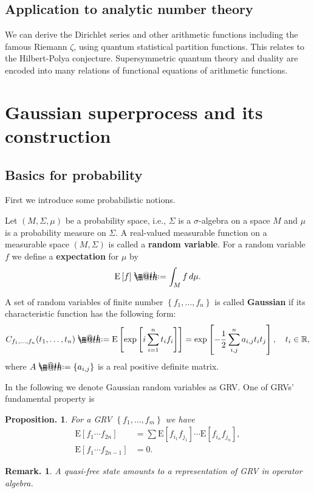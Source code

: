 \documentclass[openany, a4paper, oneside]{book}
\makeatletter
\newcommand*{\defeq}{\mathrel{\rlap{%
\raisebox{0.3ex}{$\m@th\cdot$}}%
\raisebox{-0.3ex}{$\m@th\cdot$}}%
=}
\theoremstyle{break}
\newtheorem{prop}[thm]{Proposition.}
\theoremstyle{breakdefn}
\newtheorem{rem}[thm]{Remark.}
\newcommand{\sqbk}[1]{\left[#1\right]}
\newcommand{\cbk}[1]{\left\{#1\right\}}
\newcommand{\bbR}{\mathbb{R}}
\newcommand{\E}[1]{\rmE\sqbk{#1}}
\newcommand{\rmE}{\mathrm{E}}
\makeatother
\begin{document}
\subsection{Application to analytic number theory \cite{AsaoArai17}}
\label{sec-8-2-1-3}

We can derive the Dirichlet series and other arithmetic functions including the famous Riemann $\zeta$,
using quantum statistical partition functions.
This relates to the Hilbert-Polya conjecture.
Supersymmetric quantum theory and duality are encoded into many relations of functional equations of arithmetic functions.
\section{Gaussian superprocess and its construction}
\label{sec-8-2-2}
\subsection{Basics for probability}
\label{sec-8-2-2-1}

First we introduce some probabilistic notions.

Let $(M, \Sigma, \mu)$ be a probability space, i.e.,
$\Sigma$ is a $\sigma$-algebra on a space $M$ and $\mu$ is a probability measure on $\Sigma$.
A real-valued measurable function on a measurable space $(M, \Sigma)$ is called a \textbf{random variable}.
For a random variable $f$ we define a \textbf{expectation} for $\mu$ by
\begin{align}
 \E{f} \defeq \int_M f \, d \mu.
\end{align}

A set of random variables of finite number $\cbk{f_1, \dots, f_n}$ is called \textbf{Gaussian}
if its characteristic function has the following form:
\begin{align}
 C_{f_1, \dots, f_n} (t_1, \dots, t_n)
 \defeq
 \E{\exp \sqbk{i \sum_{i=1}^n t_i f_i}}
 =
 \exp \sqbk{- \frac{1}{2} \sum_{i,j}^{n} a_{i,j} t_i t_j}, \quad t_i \in \bbR,
\end{align}
where $A \defeq \cbk{a_{i,j}}$ is a real positive definite matrix.

In the following we denote Gaussian random variables as GRV.
One of GRVs' fundamental property is
\begin{prop}
 For a GRV $\cbk{f_1, \dots, f_m}$ we have
 \begin{align}
  \E{f_1 \cdots f_{2n}}
  &=
  \sum \E{f_{i_1} f_{j_1}}  \cdots \E{f_{i_n} f_{j_n}}, \\
  \E{f_1 \cdots f_{2n-1}}
  &= 0.
 \end{align}
\end{prop}
\begin{rem}
 A quasi-free state amounts to a representation of GRV in operator algebra.
\end{rem}
\end{document}
